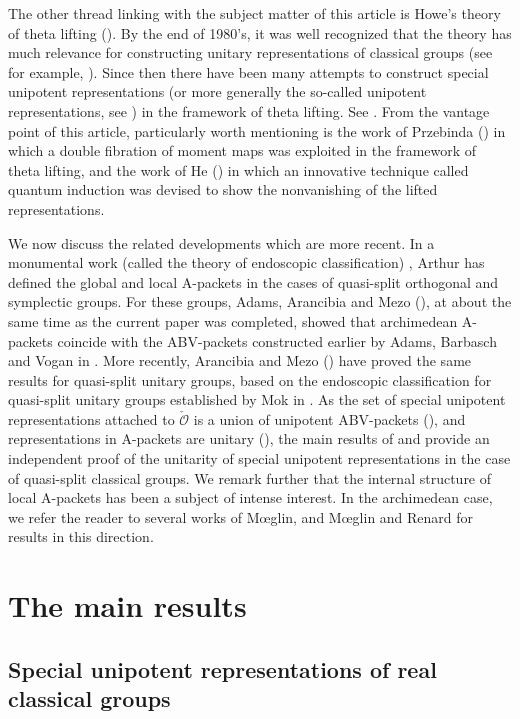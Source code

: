 \documentclass[11pt,a4paper]{amsart}
\newcommand{\CO}{{\mathcal {O}}}
\numberwithin{equation}{section}
\theoremstyle{remark}
\begin{document}
The other thread linking with the subject matter of this article is  Howe's theory of theta lifting (\cite{Howe79,Howe89}). By the
end of 1980's, it was well recognized that the theory has much relevance for constructing unitary representations of
classical groups (see for example, \cite{HoweRank,Li89}). Since then there have been many attempts to construct special unipotent representations (or more generally the so-called unipotent representations, see \cite{VoBook})
in the framework of theta lifting. See \cites{Sa,HZ,HL,Br,He,Tr,PT,LM,B17, Mo17}.
From the vantage point of this article, particularly worth mentioning is the work of Przebinda (\cites{Pz1,Pz2}) in which a double
fibration of moment maps was exploited in the framework of theta lifting, and the work of He (\cite{He}) in which an innovative technique called quantum
induction was devised to show the nonvanishing of the lifted representations.

We now discuss the related developments which are more recent. In a monumental work (called the theory of endoscopic classification) \cite{ArEnd}, Arthur has defined the global and local A-packets in the cases of quasi-split orthogonal and symplectic groups.  For these groups, Adams, Arancibia and Mezo (\cite{AAM}),  at about the same time as the current paper was completed, showed that archimedean A-packets coincide with the ABV-packets constructed earlier by Adams, Barbasch and Vogan in \cite{ABV}. More recently, Arancibia and Mezo (\cite{AM}) have proved the same results for quasi-split unitary groups, based on the endoscopic classification for quasi-split unitary groups established by Mok in \cite{Mok}. As the set of special unipotent representations attached to $\check \CO$ is a union of unipotent ABV-packets (\cite[Corollary 27.13]{ABV}), and representations in A-packets are %
unitary (\cite{ArEnd,Mok}), the main results of \cite{AAM} and \cite{AM} provide an independent proof of the unitarity of special unipotent representations in the case of  quasi-split classical groups. We remark further that the internal structure of local A-packets has been a subject of intense interest. 
In the archimedean case, we refer the reader to several works \cite{Mo17,MR18a,MR18b,MR19,MR20} of M{\oe}glin, and M{\oe}glin and Renard  for results in this direction. 


\section{The main results}
\subsection{Special unipotent representations of real classical groups}\label{secsu}
\end{document}
